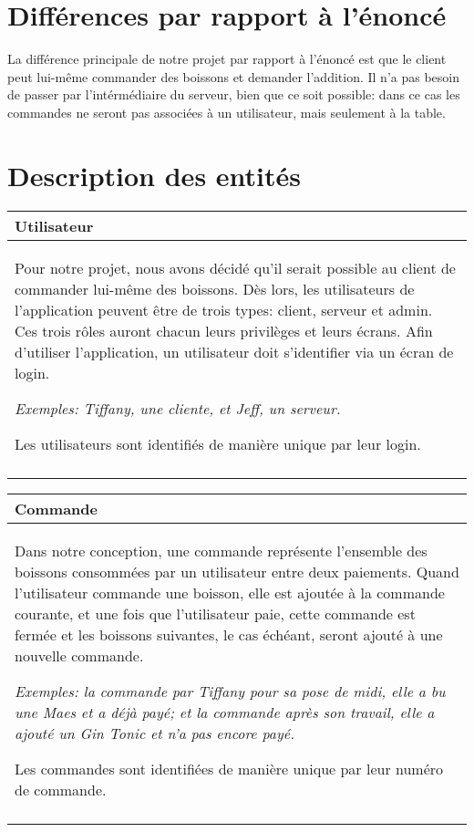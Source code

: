 \documentclass[a4paper,10pt]{article}
\begin{document}

\section{Différences par rapport à l'énoncé}

La différence principale de notre projet par rapport à l'énoncé est que le client peut lui-même commander des boissons et demander l'addition. Il n'a pas besoin de passer par l'intérmédiaire du serveur, bien que ce soit possible: dans ce cas les commandes ne seront pas associées à un utilisateur, mais seulement à la table.

\section{Description des entités}

\begin{tabu}{X}
\textbf{Utilisateur} \\
\toprule
Pour notre projet, nous avons décidé qu'il serait possible au client de commander lui-même des boissons. Dès lors, les utilisateurs de l'application peuvent être de trois types: client, serveur et admin. Ces trois rôles auront chacun leurs privilèges et leurs écrans. Afin d'utiliser l'application, un utilisateur doit s'identifier via un écran de login.

\textsl{Exemples: Tiffany, une cliente, et Jeff, un serveur.}

Les utilisateurs sont identifiés de manière unique par leur login. \\\\
\end{tabu}

\begin{tabu}{X}
\textbf{Commande} \\
\toprule

Dans notre conception, une commande représente l'ensemble des boissons consommées par un utilisateur entre deux paiements. Quand l'utilisateur commande une boisson, elle est ajoutée à la commande courante, et une fois que l'utilisateur paie, cette commande est fermée et les boissons suivantes, le cas échéant, seront ajouté à une nouvelle commande.

\textsl{Exemples: la commande  par Tiffany pour sa pose de midi, elle a bu une Maes et a déjà payé; et la commande  après son travail, elle a ajouté un Gin Tonic et n'a pas encore payé.}

Les commandes sont identifiées de manière unique par leur numéro de commande. \\\\
\end{tabu}
\end{document}
